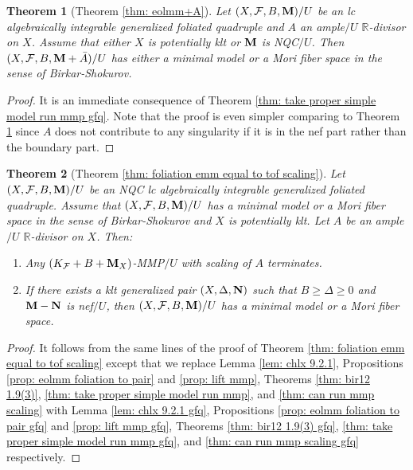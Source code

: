 \documentclass[11pt]{amsart}
\numberwithin{equation}{section}
\newcommand{\Mm}{{\bf{M}}}
\newcommand{\Nn}{{\bf{N}}}
\newcommand{\Rr}{\mathbb{R}}
\newcommand{\Ff}{\mathcal{F}}
\newtheorem{thm}{Theorem}[section]
\theoremstyle{definition}
\theoremstyle{definition}
\theoremstyle{definition}
\begin{document}
\begin{thm}[Theorem \ref{thm: eolmm+A}]\label{thm: eolmm+A gfq} 
Let $(X,\Ff,B,\Mm)/U$ be an lc algebraically integrable generalized foliated quadruple and $A$ an ample$/U$ $\Rr$-divisor on $X$. Assume that either $X$ is potentially klt or $\Mm$ is NQC$/U$. Then $(X,\Ff,B,\Mm+\bar A)/U$ has either a minimal model or a Mori fiber space in the sense of Birkar-Shokurov.
\end{thm}
\begin{proof}
    It is an immediate consequence of Theorem \ref{thm: take proper simple model run mmp gfq}. Note that the proof is even simpler comparing to Theorem \ref{thm: eolmm+A gfq} since $A$ does not contribute to any singularity if it is in the nef part rather than the boundary part.
\end{proof}

\begin{thm}[Theorem \ref{thm: foliation emm equal to tof scaling}]\label{thm: foliation emm equal to tof scaling gfq}
Let $(X,\Ff,B,\Mm)/U$ be an NQC lc algebraically integrable generalized foliated quadruple. Assume that $(X,\Ff,B,\Mm)/U$ has a minimal model or a Mori fiber space in the sense of Birkar-Shokurov and $X$ is potentially klt. Let $A$ be an ample$/U$ $\Rr$-divisor on $X$. Then:
\begin{enumerate}
    \item  Any  $(K_{\Ff}+B+\Mm_X)$-MMP$/U$ with scaling of $A$ terminates.
    \item If there exists a klt generalized  pair $(X,\Delta,\Nn)$ such that $B\geq\Delta\geq 0$ and $\Mm-\Nn$ is nef$/U$, then $(X,\Ff,B,\Mm)/U$ has a minimal model or a Mori fiber space.
\end{enumerate}
\end{thm}
\begin{proof}
    It follows from the same lines of the proof of Theorem \ref{thm: foliation emm equal to tof scaling} except that we replace Lemma \ref{lem: chlx 9.2.1}, Propositions \ref{prop: eolmm foliation to pair} and \ref{prop: lift mmp}, Theorems \ref{thm: bir12 1.9(3)}, \ref{thm: take proper simple model run mmp}, and \ref{thm: can run mmp scaling} with Lemma \ref{lem: chlx 9.2.1 gfq}, Propositions \ref{prop: eolmm foliation to pair gfq} and \ref{prop: lift mmp gfq}, Theorems \ref{thm: bir12 1.9(3) gfq}, \ref{thm: take proper simple model run mmp gfq}, and \ref{thm: can run mmp scaling gfq} respectively. 
\end{proof}
\end{document}

